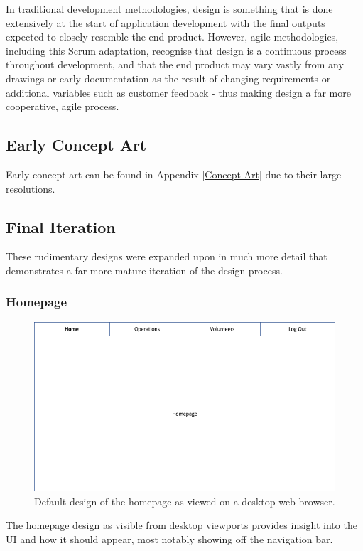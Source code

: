 In traditional development methodologies, design is something that is done extensively at the start of application development with the final outputs expected to closely resemble the end product. However, agile methodologies, including this Scrum adaptation, recognise that design is a continuous process throughout development, and that the end product may vary vastly from any drawings or early documentation as the result of changing requirements or additional variables such as customer feedback - thus making design a far more cooperative, agile process. \cite{Kiss1}

\subsection{Early Concept Art}
Early concept art can be found in Appendix \ref{Concept Art} due to their large resolutions.

\subsection{Final Iteration}
These rudimentary designs were expanded upon in much more detail that demonstrates a far more mature iteration of the design process.

\subsubsection{Homepage}
\begin{figure}[!ht]
    \includegraphics[width=1.0\textwidth]{Figures/design-homepage}
    \caption{Default design of the homepage as viewed on a desktop web browser.}
    \label{fig:homepage}
\end{figure}

The homepage design as visible from desktop viewports provides insight into the UI and how it should appear, most notably showing off the navigation bar.

